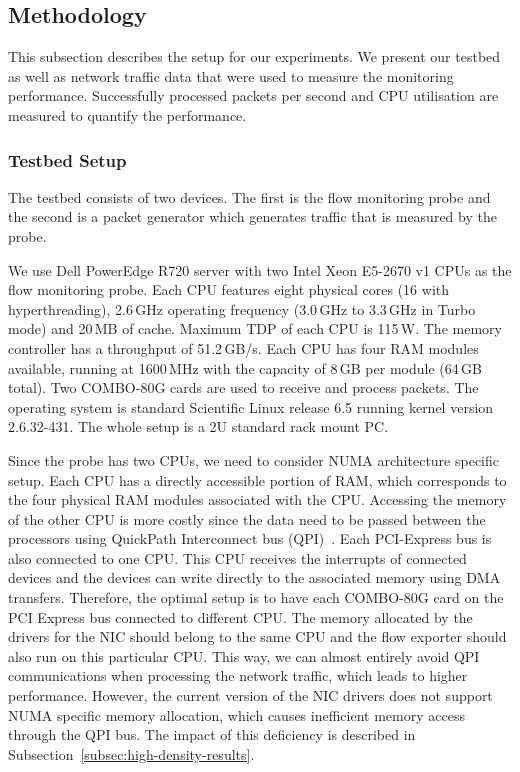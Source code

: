 \subsection{Methodology} \label{subsec:high-density-methodology}

This subsection describes the setup for our experiments. We present our testbed as well as network traffic data that were used to measure the monitoring performance. Successfully processed packets per second and CPU utilisation are measured to quantify the performance.

\subsubsection{Testbed Setup}

The testbed consists of two devices. The first is the flow monitoring probe and the second is a packet generator which generates traffic that is measured by the probe.

We use Dell PowerEdge R720 server with two Intel Xeon E5-2670 v1 CPUs as the flow monitoring probe. Each CPU features eight physical cores (16 with hyperthreading), 2.6\,GHz operating frequency (3.0\,GHz to 3.3\,GHz in Turbo mode) and 20\,MB of cache. Maximum TDP of each CPU is 115\,W. The memory controller has a throughput of 51.2\,GB/s. Each CPU has four RAM modules available, running at 1600\,MHz with the capacity of 8\,GB per module (64\,GB total). Two COMBO-80G cards are used to receive and process packets. The operating system is standard Scientific Linux release 6.5 running kernel version 2.6.32-431. The whole setup is a 2U standard rack mount PC.

Since the probe has two CPUs, we need to consider NUMA architecture specific setup. Each CPU has a directly accessible portion of RAM, which corresponds to the four physical RAM modules associated with the CPU. Accessing the memory of the other CPU is more costly since the data need to be passed between the processors using QuickPath Interconnect bus (QPI)~\cite{IntelCorporation-2009-Introduction}. Each PCI-Express bus is also connected to one CPU. This CPU receives the interrupts of connected devices and the devices can write directly to the associated memory using DMA transfers. Therefore, the optimal setup is to have each COMBO-80G card on the PCI Express bus connected to different CPU. The memory allocated by the drivers for the NIC should belong to the same CPU and the flow exporter should also run on this particular CPU. This way, we can almost entirely avoid QPI communications when processing the network traffic, which leads to higher performance. However, the current version of the NIC drivers does not support NUMA specific memory allocation, which causes inefficient memory access through the QPI bus. The impact of this deficiency is described in Subsection~\ref{subsec:high-density-results}.


